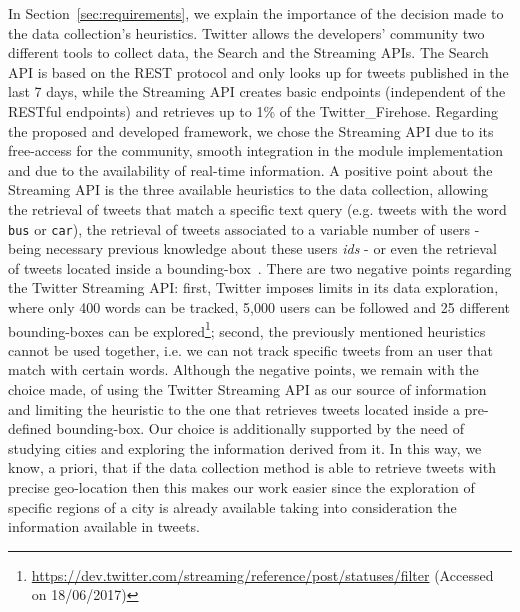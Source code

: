 In Section~\ref{sec:requirements}, we explain the importance of the decision made to the data collection's heuristics. Twitter allows the developers' community two different tools to collect data, the Search and the Streaming \glspl{API}. The Search \gls{API} is based on the \gls{REST} protocol and only looks up for tweets published in the last 7 days, while the Streaming \gls{API} creates basic endpoints (independent of the \gls{REST}ful endpoints) and retrieves up to 1\% of the \gls{Twitter_Firehose}. Regarding the proposed and developed framework, we chose the Streaming \gls{API} due to its free-access for the community, smooth integration in the module implementation and due to the availability of real-time information. A positive point about the Streaming \gls{API} is the three available heuristics to the data collection, allowing the retrieval of tweets that match a specific text query (e.g. tweets with the word \texttt{bus} or \texttt{car}), the retrieval of tweets associated to a variable  number of users - being necessary previous knowledge about these users \textit{ids} - or even the retrieval of tweets located inside a bounding-box~\cite{mac2016effects}. There are two negative points regarding the Twitter Streaming \gls{API}: first, Twitter imposes limits in its data exploration, where only 400 words can be tracked, 5,000 users can be followed and 25 different bounding-boxes can be explored\footnote{\url{https://dev.twitter.com/streaming/reference/post/statuses/filter} (Accessed on 18/06/2017)}; second, the previously mentioned heuristics cannot be used together, i.e. we can not track specific tweets from an user that match with certain words. Although the negative points, we remain with the choice made, of using the Twitter Streaming \gls{API} as our source of information and limiting the heuristic to the one that retrieves tweets located inside a pre-defined bounding-box. Our choice is additionally supported by the need of studying cities and exploring the information derived from it. In this way, we know, a priori, that if the data collection method is able to retrieve tweets with precise geo-location then this makes our work easier since the exploration of specific regions of a city is already available taking into consideration the information available in tweets.


